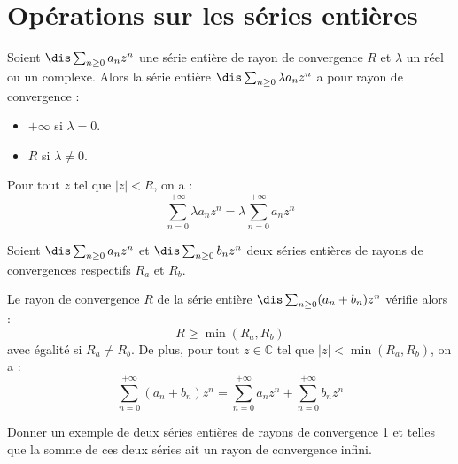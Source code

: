 \documentclass[a4paper,10pt]{report}
\begin{document}
\begin{preuve}
\vspace{4cm}
\end{preuve}

\section{Opérations sur les séries entières}

\begin{thm}
Soient $\dis \sum_{n \geq 0} a_n z^n$ une série entière de rayon de convergence $R$ et $\lambda$ un réel ou un complexe. Alors la série entière $\dis \sum_{n \geq 0} \lambda a_n z^n$ a pour rayon de convergence  :
\begin{itemize}
\item $+ \infty$ si $\lambda =0$.
\item $R$ si $\lambda \neq 0$.
\end{itemize}
Pour tout $z$ tel que $\vert z \vert < R$, on a :
$$ \sum_{n = 0}^{+ \infty} \lambda a_n z^n = \lambda \sum_{n = 0}^{+ \infty} a_n z^n $$
\end{thm}




\begin{thm}
Soient $\dis \sum_{n \geq 0} a_n z^n$ et $\dis \sum_{n \geq 0} b_n z^n$ deux séries entières de rayons de convergences respectifs $R_a$ et $R_b$.

\noindent Le rayon de convergence $R$ de la série entière $\dis \sum_{n \geq 0} (a_n+b_n) z^n$ vérifie alors :
$$ R \geq \min(R_a,R_b)$$
avec égalité si $R_a \neq R_b$. De plus, pour tout $z \in \mathbb{C}$ tel que $\vert z \vert < \min(R_a, R_b)$, on a :
$$ \sum_{n = 0}^{+ \infty} (a_n +b_n) z^n =  \sum_{n = 0}^{+ \infty} a_n z^n +  \sum_{n = 0}^{+ \infty} b_n z^n$$
\end{thm}

\begin{preuve}

\vspace{3.5cm}
\end{preuve}

\newpage

\phantom{test}

\vspace{3.5cm}

\begin{exa} Donner un exemple de deux séries entières de rayons de convergence 1 et telles que la somme de ces deux séries ait un rayon de convergence infini.
\end{exa}
\end{document}
